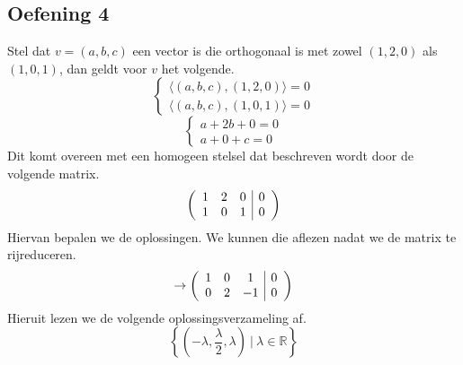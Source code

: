 \documentclass[lineaire_algebra_oplossingen.tex]{subfiles}
\begin{document}
\subsection{Oefening 4}
Stel dat $v=(a,b,c)$ een vector is die orthogonaal is met zowel $(1,2,0)$ als $(1,0,1)$, dan geldt voor $v$ het volgende.
\[
\left\{
\begin{array}{c}
\langle (a,b,c) , (1,2,0) \rangle = 0\\
\langle (a,b,c) , (1,0,1) \rangle = 0
\end{array}
\right.
\]
\[
\left\{
\begin{array}{c}
a + 2b + 0 = 0\\
a + 0 + c = 0
\end{array}
\right.
\]
Dit komt overeen met een homogeen stelsel dat beschreven wordt door de volgende matrix.
\[
\left(
\begin{array}{c c c | c}
1 & 2 & 0 & 0\\
1 & 0 & 1 & 0
\end{array}
\right)
\]
Hiervan bepalen we de oplossingen. We kunnen die aflezen nadat we de matrix te rijreduceren.
\[
\rightarrow
\left(
\begin{array}{c c c | c}
1 & 0 & 1 & 0\\
0 & 2 & -1 & 0
\end{array}
\right)
\]
Hieruit lezen we de volgende oplossingsverzameling af.
\[
\left\{
(-\lambda,\frac{\lambda}{2},\lambda)\ |\ \lambda\in\mathbb{R}
\right\}
\]
\end{document}
